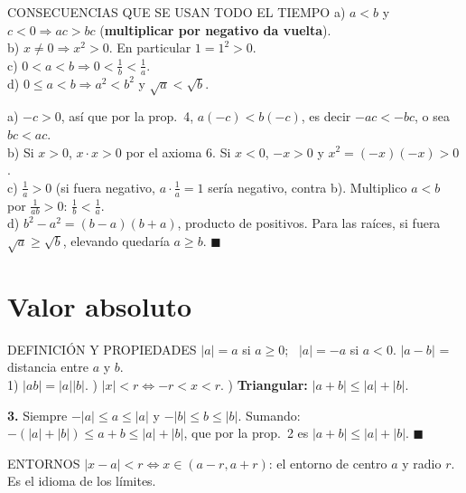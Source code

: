 \agregado
\begin{sello}{CONSECUENCIAS QUE SE USAN TODO EL TIEMPO}
a) $a<b$ y $c<0\Rightarrow ac>bc$ (\textbf{multiplicar por negativo da vuelta}).\\
b) $x\neq0\Rightarrow x^2>0$. En particular $1=1^2>0$.\\
c) $0<a<b\Rightarrow 0<\frac1b<\frac1a$.\\
d) $0\le a<b\Rightarrow a^2<b^2$ y $\sqrt a<\sqrt b$.
\end{sello}
\begin{demo}
a) $-c>0$, así que por la prop.\ 4, $a(-c)<b(-c)$, es decir $-ac<-bc$, o sea $bc<ac$.\\[2pt]
b) Si $x>0$, $x\cdot x>0$ por el axioma 6. Si $x<0$, $-x>0$ y $x^2=(-x)(-x)>0$.\\[2pt]
c) $\frac1a>0$ (si fuera negativo, $a\cdot\frac1a=1$ sería negativo, contra b). Multiplico $a<b$ por $\frac1{ab}>0$: $\frac1b<\frac1a$.\\[2pt]
d) $b^2-a^2=(b-a)(b+a)$, producto de positivos. Para las raíces, si fuera $\sqrt a\ge\sqrt b$, elevando quedaría $a\ge b$. $\blacksquare$
\end{demo}

\section{Valor absoluto}
\agregado
\begin{sello}{DEFINICIÓN Y PROPIEDADES}
$|a|=a$ si $a\ge0$; \ $|a|=-a$ si $a<0$. \quad $|a-b|$ = distancia entre $a$ y $b$.\\[3pt]
1) $|ab|=|a||b|$. ) $|x|<r\iff-r<x<r$. ) \textbf{Triangular:} $|a+b|\le|a|+|b|$.
\end{sello}
\begin{demo}
\textbf{3.} Siempre $-|a|\le a\le|a|$ y $-|b|\le b\le|b|$. Sumando: $-(|a|+|b|)\le a+b\le|a|+|b|$, que por la prop.\ 2 es $|a+b|\le|a|+|b|$. $\blacksquare$
\end{demo}
\begin{memo}{ENTORNOS}
$|x-a|<r\iff x\in(a-r,a+r)$: el entorno de centro $a$ y radio $r$. Es el idioma de los límites.
\end{memo}

